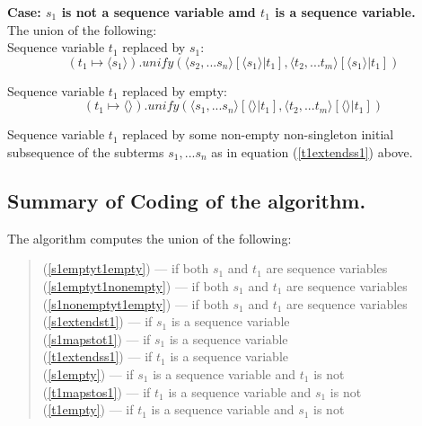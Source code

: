 \documentclass[10pt,a4paper,fleqn]{article}
\begin{document}
\noindent
\textbf{Case: $s_1$ is not a sequence variable amd $t_1$ is a sequence variable.} \\

\noindent 
The union of the following: \\

\noindent
Sequence variable $t_1$ replaced by $s_1$:
\begin{equation}
\label{t1mapstos1}
 (t_1 \mapsto \langle s_1 \rangle)
      .unify(\langle s_2,...s_n \rangle[\langle s_1 \rangle|t_1],
             \langle t_2,...t_m \rangle[\langle s_1 \rangle|t_1]
						)
\end{equation}

\noindent
Sequence variable $t_1$ replaced by empty:
\begin{equation}
 \label{t1empty}
 (t_1 \mapsto \langle \rangle)
      .unify(\langle s_1,...s_n \rangle[\langle \rangle|t_1],
             \langle t_2,...t_m \rangle[\langle \rangle|t_1]
						) 
\end{equation}
 

\noindent
Sequence variable $t_1$ replaced by some
non-empty non-singleton initial subsequence of the subterms $s_1,...s_n$ 
as in equation (\ref{t1extendss1}) above. \\

\subsection{Summary of Coding of the algorithm.}
The algorithm computes the union of the following: 
\begin{quote}
(\ref{s1emptyt1empty}) --- if both $s_1$ and $t_1$ are sequence variables \\
(\ref{s1emptyt1nonempty}) --- if both $s_1$ and $t_1$ are sequence variables \\
(\ref{s1nonemptyt1empty}) --- if both $s_1$ and $t_1$ are sequence variables \\
(\ref{s1extendst1}) --- if $s_1$ is a sequence variable  \\
(\ref{s1mapstot1}) --- if $s_1$ is a sequence variable \\
(\ref{t1extendss1}) --- if $t_1$ is a sequence variable \\
(\ref{s1empty}) --- if $s_1$ is a sequence variable and $t_1$ is not\\
(\ref{t1mapstos1}) --- if $t_1$ is a sequence variable and $s_1$ is not\\
(\ref{t1empty}) --- if $t_1$ is a sequence variable and $s_1$ is not \\


\end{quote}


 
\end{document}
